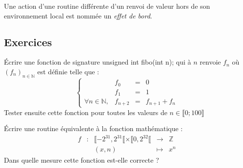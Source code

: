 \documentclass[../../../main.tex]{subfiles}
\begin{document}
Une action d'une routine différente d'un renvoi de valeur hors de son environnement local est nommée un \textit{effet de bord}.
\subsection{Exercices}
\newline Écrire une fonction de signature \textsf{unsigned int fibo(int n);} qui à $n$ renvoie $f_{n}$ où $(f_{n})_{n\in{\mathbb{N}}}$ est définie telle que :
 $$
\left\{\begin{array}{llcl}
& f_{0} & = & 0 \\
& f_{1} & = & 1 \\
\forall{n\in{\mathbb{N}}}, & f_{n+2} & = & f_{n+1} + f_{n}
\end{array}\right.
$$
Tester ensuite cette fonction pour toutes les valeurs de $n\in{\llbracket 0; 100\rrbracket}$
 
 Écrire une routine équivalente à la fonction mathématique :
 $$
 \begin{array}{lclcl}
f & : & \llbracket-2^{31}, 2^{31}\llbracket\times{\llbracket0, 2^{32}\llbracket}& \rightarrow & \mathbb{Z} \\
& & (x, n) & \mapsto & x^{n}
\end{array}
$$
Dans quelle mesure cette fonction est-elle correcte ?
\end{document}
